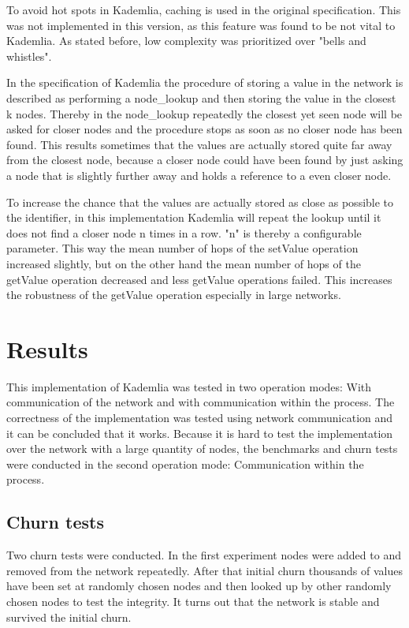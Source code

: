 \documentclass[a4paper, 12pt]{article} %
\begin{document}
To avoid hot spots in Kademlia, caching is used in the original specification. This was not implemented in this version, as this feature was found to be not vital to Kademlia. As stated before, low complexity was prioritized over "bells and whistles".

In the specification of Kademlia the procedure of storing a value in the network is described as performing a node\_lookup and then storing the value in the closest k nodes. Thereby in the node\_lookup repeatedly the closest yet seen node will be asked for closer nodes and the procedure stops as soon as no closer node has been found. This results sometimes that the values are actually stored quite far away from the closest node, because a closer node could have been found by just asking a node that is slightly further away and holds a reference to a even closer node. 

To increase the chance that the values are actually stored as close as possible to the identifier, in this implementation Kademlia will repeat the lookup until it does not find a closer node n times in a row. "n" is thereby a configurable parameter. This way the mean number of hops of the setValue operation increased slightly, but on the other hand the mean number of hops of the getValue operation decreased and less getValue operations failed. This increases the robustness of the getValue operation especially in large networks.

\newpage
\section{Results}

This implementation of Kademlia was tested in two operation modes: With communication of the network and with communication within the process. The correctness of the implementation was tested using network communication and it can be concluded that it works. Because it is hard to test the implementation over the network with a large quantity of nodes, the benchmarks and churn tests were conducted in the second operation mode: Communication within the process.

\subsection{Churn tests}

Two churn tests were conducted. In the first experiment nodes were added to and removed from the network repeatedly. After that initial churn thousands of values have been set at randomly chosen nodes and then looked up by other randomly chosen nodes to test the integrity. It turns out that the network is stable and survived the initial churn.
\end{document}
